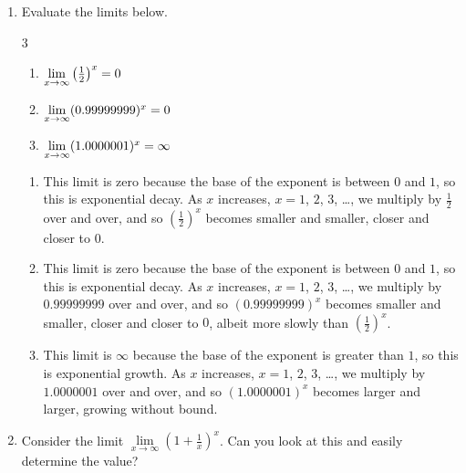 \documentclass[main]{subfiles}
\begin{document}
\begin{enumerate}

\item Evaluate the limits below.
\begin{multicols}{3}
\begin{enumerate}



  \item $\lim\limits_{x\to\infty} \left(\frac{1}{2}\right)^x=0$

  \item $\lim\limits_{x\to\infty} (0.99999999)^x=0$

  \item $\lim\limits_{x\to\infty} (1.0000001)^x=\infty$

\end{enumerate}
\end{multicols}

\begin{solution}
\begin{enumerate}

  \item This limit is zero because the base of the exponent is between $0$ and $1$,
    so this is exponential decay. As $x$ increases, $x=1$, $2$, $3$, \dots , we
    multiply by $\frac{1}{2}$ over and over, and so $\left(\frac{1}{2}\right)^x$
    becomes smaller and smaller, closer and closer to $0$.

  \item This limit is zero because the base of the exponent is between $0$ and $1$,
    so this is exponential decay. As $x$ increases, $x=1$, $2$, $3$, \dots , we
    multiply by $0.99999999$ over and over, and so $(0.99999999)^x$
    becomes smaller and smaller, closer and closer to $0$, albeit more slowly than
    $\left(\frac{1}{2}\right)^x$.

  \item This limit is $\infty$ because the base of the exponent is greater than
    $1$, so this is exponential growth. As $x$ increases, $x=1$, $2$, $3$, \dots ,
    we multiply by $1.0000001$ over and over, and so $(1.0000001)^x$
    becomes larger and larger, growing without bound.

\end{enumerate}
\end{solution}


\item
\begin{problem}[\stretch{0.5}]
  Consider the limit $\lim\limits_{x\to\infty} (1+\frac{1}{x})^x$. Can you 
  look at this and easily determine the value?
\end{problem}


\end{enumerate}
\end{document}

